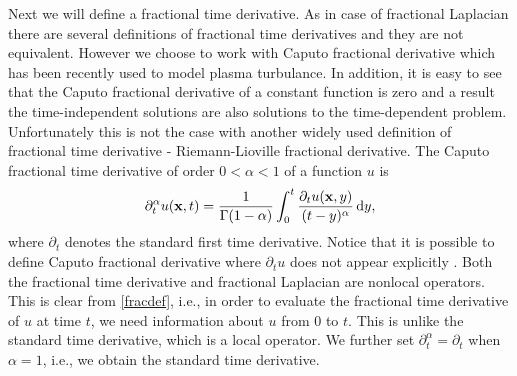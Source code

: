\documentclass{siamart1116}
\begin{document}
Next we will define a fractional time derivative. As in case of fractional Laplacian there
are several definitions of fractional time derivatives and they are not equivalent. However 
we choose to work with Caputo fractional derivative which has been recently used to model 
plasma turbulance. In addition, it is easy to see that the Caputo fractional derivative of a constant function
is zero and a result the time-independent solutions are also solutions to the time-dependent
problem. Unfortunately this is not the case with another widely used definition of fractional
time derivative - Riemann-Lioville fractional derivative.
The Caputo fractional time derivative of order $0<\alpha<1$ of a function $u$ is
\begin{equation}\label{fracdef}
\partial_t^{\alpha}u({\bf x},t)=\frac{1}{\Gamma(1-\alpha)}\int_{0}^{t}\frac{\partial_tu({\bf x},y)}{(t-y)^{\alpha}}\,\mathrm{d}y,
\end{equation}
where $\partial_t$ denotes the standard first time derivative. Notice that it is possible
to define Caputo fractional derivative where $\partial_t u$ does not appear explicitly \cite{galfractional}. 
Both the fractional time derivative and fractional Laplacian are nonlocal operators. 
This is clear from \eqref{fracdef}, i.e., in order to evaluate the fractional time derivative 
of $u$ at time $t$, we need information about $u$ from $0$ to $t$. This is unlike the standard time derivative, which is a local operator. We further set $\partial_t^\alpha = \partial_t$ 
when $\alpha = 1$, i.e., we obtain the standard time derivative. 
\end{document}

